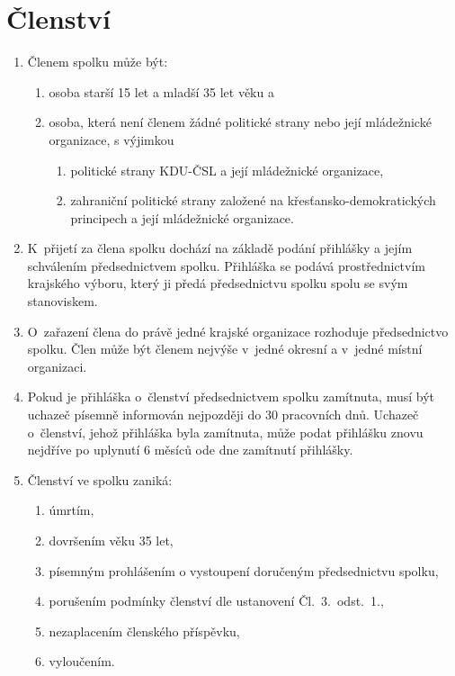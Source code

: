\documentclass[a4paper]{article}
\begin{document}
\section{Členství}
    \begin{enumerate}
    \item Členem spolku může být:
        \begin{enumerate}
             \item osoba starší 15 let a mladší 35 let věku a
             \item osoba, která není členem žádné politické strany nebo její mládežnické organizace, s výjimkou
                \begin{enumerate}
                     \item politické strany KDU-ČSL a její mládežnické organizace,
                     \item zahraniční politické strany založené na křesťansko-demokratických
                        principech a její mládežnické organizace.
                \end{enumerate}
        \end{enumerate}

    \item K~přijetí za člena spolku dochází na základě podání přihlášky a
        jejím schválením předsednictvem spolku. Přihláška se podává
        prostřednictvím krajského výboru, který ji předá předsednictvu
        spolku spolu se svým stanoviskem.

    \item O~zařazení člena do právě jedné krajské organizace rozhoduje
        předsednictvo spolku. Člen může být členem nejvýše v~jedné okresní a v~jedné místní
        organizaci.

    \item Pokud je přihláška o~členství předsednictvem spolku zamítnuta,
        musí být uchazeč písemně informován nejpozději do 30 pracovních dnů.
        Uchazeč o~členství, jehož přihláška byla zamítnuta, může podat
        přihlášku znovu nejdříve po uplynutí 6 měsíců ode dne zamítnutí
        přihlášky.

    \item Členství ve spolku zaniká:
        \begin{enumerate}
        \item úmrtím,
        \item dovršením věku 35 let,
        \item písemným prohlášením o vystoupení doručeným předsednictvu
            spolku,
        \item porušením podmínky členství dle ustanovení Čl.~3.~odst.~1.,
        \item nezaplacením členského příspěvku,
        \item vyloučením.
        \end{enumerate}



\end{enumerate}
\end{document}
